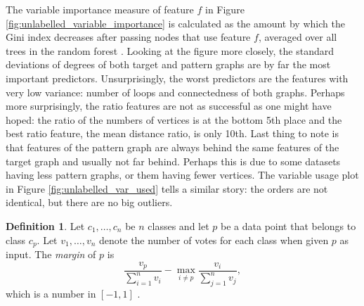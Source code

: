 \documentclass{l4proj}
\theoremstyle{definition}
\newtheorem{definition}{Definition}[section]
\theoremstyle{remark}
\begin{document}
The variable importance measure of feature $f$ in Figure
\ref{fig:unlabelled_variable_importance} is calculated as the amount by which
the Gini index decreases after passing nodes that use feature $f$, averaged over
all trees in the random forest \cite{James:2014:ISL:2517747}. Looking at the
figure more closely, the standard deviations of degrees of both target and
pattern graphs are by far the most important predictors. Unsurprisingly, the
worst predictors are the features with very low variance: number of loops and
connectedness of both graphs. Perhaps more surprisingly, the ratio features are
not as successful as one might have hoped: the ratio of the numbers of vertices
is at the bottom 5th place and the best ratio feature, the mean distance ratio,
is only 10th. Last thing to note is that features of the pattern graph are
always behind the same features of the target graph and usually not far behind.
Perhaps this is due to some datasets having less pattern graphs, or them having
fewer vertices. The variable usage plot in Figure \ref{fig:unlabelled_var_used}
tells a similar story: the orders are not identical, but there are no big
outliers.

\begin{definition}
  Let $c_1, \dots, c_n$ be $n$ classes and let $p$ be a data point that belongs
  to class $c_p$. Let $v_1, \dots, v_n$ denote the number of votes for each
  class when given $p$ as input. The \emph{margin} of $p$ is
  \[ \frac{v_p}{\sum_{i=1}^n v_i} - \max_{i \ne p} \frac{v_i}{\sum_{j=1}^n v_j}, \]
  which is a number in $[-1, 1]$ \cite{forest}.
\end{definition}
\end{document}
